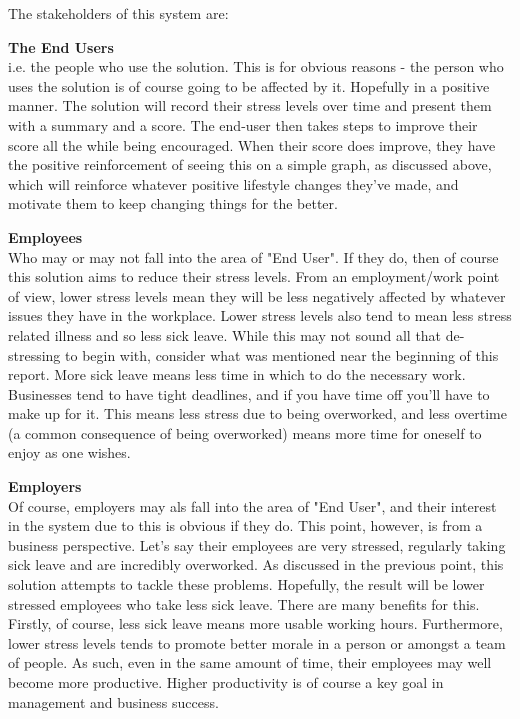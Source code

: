 \documentclass{scrartcl}
\begin{document}
The stakeholders of this system are:

\textbf{The End Users}\\
i.e. the people who use the solution. This is for obvious reasons - the person who uses the solution is of course going to be
affected by it. Hopefully in a positive manner. The solution will record their stress levels over time and present them with
a summary and a score. The end-user then takes steps to improve their score all the while being encouraged. When their score
does improve, they have the positive reinforcement of seeing this on a simple graph, as discussed above, which will reinforce
whatever positive lifestyle changes they've made, and motivate them to keep changing things for the better.

\textbf{Employees}\\
Who may or may not fall into the area of "End User". If they do, then of course this solution aims to reduce their stress levels.
From an employment/work point of view, lower stress levels mean they will be less negatively affected by whatever issues they
have in the workplace. Lower stress levels also tend to mean less stress related illness and so less sick leave. While this may
not sound all that de-stressing to begin with, consider what was mentioned near the beginning of this report. More sick leave
means less time in which to do the necessary work. Businesses tend to have tight deadlines, and if you have time off you'll have
to make up for it. This means less stress due to being overworked, and less overtime (a common consequence of being overworked)
means more time for oneself to enjoy as one wishes.

\textbf{Employers}\\
Of course, employers may als fall into the area of "End User", and their interest in the system due to this is obvious if they do.
This point, however, is from a business perspective. Let's say their employees are very stressed, regularly taking sick leave and
are incredibly overworked. As discussed in the previous point, this solution attempts to tackle these problems. Hopefully, the
result will be lower stressed employees who take less sick leave. There are many benefits for this. Firstly, of course, less sick
leave means more usable working hours. Furthermore, lower stress levels tends to promote better morale in a person or amongst
a team of people. As such, even in the same amount of time, their employees may well become more productive. Higher productivity
is of course a key goal in management and business success.
\end{document}
